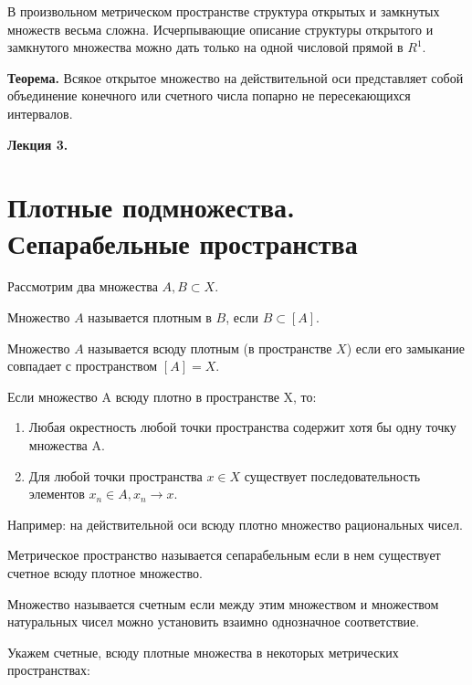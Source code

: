 \documentclass[12pt]{report}
\renewcommand{\[}{$\\\displaystyle}
\renewcommand{\]}{\\$}
\renewcommand{\[}{$\\\displaystyle}
\newcommand{\tth}[1][]{\textbf{Теорема#1.}}
\begin{document}
В произвольном метрическом пространстве структура открытых и замкнутых множеств весьма сложна. Исчерпывающие описание структуры открытого и замкнутого множества можно дать только на одной числовой прямой в $R^1$.

\tth[] Всякое открытое множество на действительной оси представляет собой объединение конечного или счетного числа попарно не пересекающихся интервалов.

\textbf{Лекция 3.}

\section{Плотные подмножества. Сепарабельные пространства}

Рассмотрим два множества $A, B\subset X$.

Множество $A$ называется плотным в $B$, если $B\subset[A]$.

Множество $A$ называется всюду плотным (в пространстве $X$) если его замыкание
совпадает с пространством $[A]=X$.

Если множество A всюду плотно в пространстве X, то:

\begin{enumerate}
  \item Любая окрестность любой точки пространства содержит хотя бы одну точку
  множества A.

  \item Для любой точки пространства $x \in X$  существует последовательность
  элементов ${x_n}\in A, x_n \rightarrow x$.
\end{enumerate}

Например: на действительной оси всюду плотно множество рациональных чисел.

Метрическое пространство называется сепарабельным если в нем существует счетное
всюду плотное множество.

Множество называется счетным если между этим множеством и множеством
натуральных чисел можно установить взаимно однозначное соответствие.

Укажем счетные, всюду плотные множества в некоторых метрических пространствах:
\end{document}
